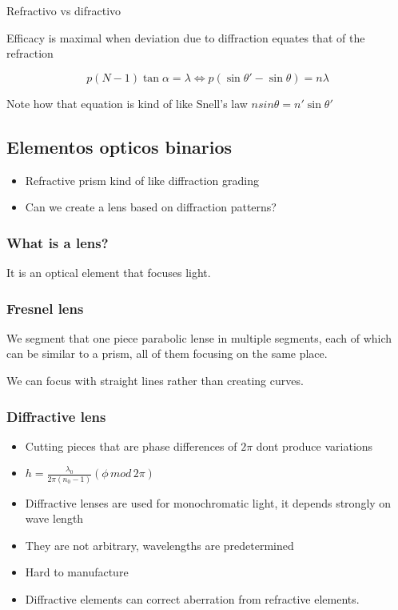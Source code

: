 \documentclass[../main/main.tex]{subfiles}
\begin{document}
Refractivo vs difractivo


Efficacy is maximal when deviation due to diffraction equates that of the refraction

\begin{equation}
p (N-1) \tan \alpha = \lambda \iff p (\sin \theta' -\sin \theta) = n \lambda
\end{equation}

Note how that equation is kind of like Snell's law $n sin \theta = n' \sin \theta ' $


\subsection{Elementos opticos binarios}

\begin{itemize}
	\item Refractive prism kind of like diffraction grading
	\item Can we create a lens based on diffraction patterns?

\end{itemize}

\subsubsection{What is a lens?}

It is an optical element that focuses light.

\subsubsection{Fresnel lens}

We segment that one piece parabolic lense in multiple segments, each of which can be similar to a prism, all of them focusing on the same place.

We can focus with straight lines rather than creating curves.

\subsubsection{Diffractive lens}

\begin{itemize}
	\item Cutting pieces that are phase differences of $2\pi$ dont produce variations
	\item $h = \frac{\lambda_{0}}{2\pi (n_{0} - 1)} (\phi\, mod \,2\pi)$
	\item Diffractive lenses are used for monochromatic light, it depends strongly on wave length
	\item They are not arbitrary, wavelengths are predetermined
	\item Hard to manufacture
	\item Diffractive elements can correct aberration from refractive elements.

\end{itemize}
\end{document}
